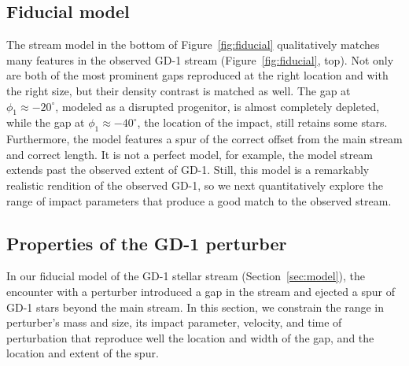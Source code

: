 \documentclass[twocolumn]{aastex62}
\begin{document}
\subsection{Fiducial model}
The stream model in the bottom of Figure~\ref{fig:fiducial} qualitatively matches many features in the observed GD-1 stream (Figure~\ref{fig:fiducial}, top).
Not only are both of the most prominent gaps reproduced at the right location and with the right size, but their density contrast is matched as well.
The gap at $\phi_1\approx-20^\circ$, modeled as a disrupted progenitor, is almost completely depleted, while the gap at $\phi_1\approx-40^\circ$, the location of the impact, still retains some stars.
Furthermore, the model features a spur of the correct offset from the main stream and correct length.
It is not a perfect model, for example, the model stream extends past the observed extent of GD-1.
Still, this model is a remarkably realistic rendition of the observed GD-1, so we next quantitatively explore the range of impact parameters that produce a good match to the observed stream.

\subsection{Properties of the GD-1 perturber}
\label{sec:perturber_properties}
In our fiducial model of the GD-1 stellar stream (Section~\ref{sec:model}), the encounter with a perturber introduced a gap in the stream and ejected a spur of GD-1 stars beyond the main stream.
In this section, we constrain the range in perturber's mass and size, its impact parameter, velocity, and time of perturbation that reproduce well the location and width of the gap, and the location and extent of the spur.
\end{document}
